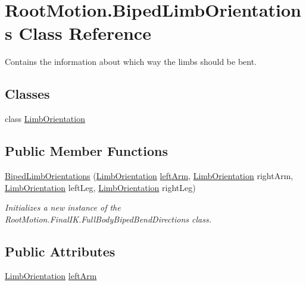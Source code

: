 \hypertarget{class_root_motion_1_1_biped_limb_orientations}{}\section{Root\+Motion.\+Biped\+Limb\+Orientations Class Reference}
\label{class_root_motion_1_1_biped_limb_orientations}


Contains the information about which way the limbs should be bent.  


\subsection*{Classes}
\begin{DoxyCompactItemize}
\item 
class \mbox{\hyperlink{class_root_motion_1_1_biped_limb_orientations_1_1_limb_orientation}{Limb\+Orientation}}
\end{DoxyCompactItemize}
\subsection*{Public Member Functions}
\begin{DoxyCompactItemize}
\item 
\mbox{\hyperlink{class_root_motion_1_1_biped_limb_orientations_ab083dfcae050ea226d3694a442e064b9}{Biped\+Limb\+Orientations}} (\mbox{\hyperlink{class_root_motion_1_1_biped_limb_orientations_1_1_limb_orientation}{Limb\+Orientation}} \mbox{\hyperlink{class_root_motion_1_1_biped_limb_orientations_a7c660460988757efd2d8e47292db7e51}{left\+Arm}}, \mbox{\hyperlink{class_root_motion_1_1_biped_limb_orientations_1_1_limb_orientation}{Limb\+Orientation}} right\+Arm, \mbox{\hyperlink{class_root_motion_1_1_biped_limb_orientations_1_1_limb_orientation}{Limb\+Orientation}} left\+Leg, \mbox{\hyperlink{class_root_motion_1_1_biped_limb_orientations_1_1_limb_orientation}{Limb\+Orientation}} right\+Leg)
\begin{DoxyCompactList}\small\item\em Initializes a new instance of the Root\+Motion.\+Final\+I\+K.\+Full\+Body\+Biped\+Bend\+Directions class. \end{DoxyCompactList}\end{DoxyCompactItemize}
\subsection*{Public Attributes}
\begin{DoxyCompactItemize}
\item 
\mbox{\hyperlink{class_root_motion_1_1_biped_limb_orientations_1_1_limb_orientation}{Limb\+Orientation}} \mbox{\hyperlink{class_root_motion_1_1_biped_limb_orientations_a7c660460988757efd2d8e47292db7e51}{left\+Arm}}
\end{DoxyCompactItemize}
